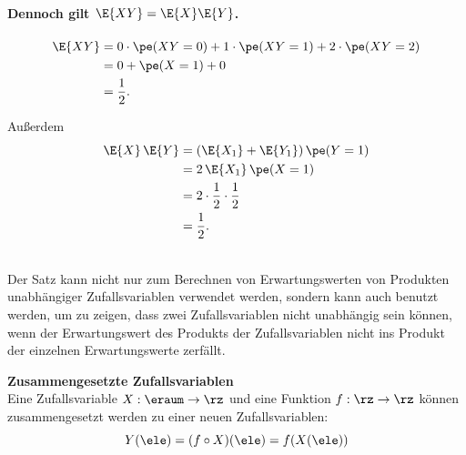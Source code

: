 \begin{bsp}
    \paragraph{Dennoch gilt \(\E{XY}=\E{X}\E{Y}\).}

    \[
        \begin{aligned}
            \E{XY}
            &=
            0\cdot \pe(XY=0)
            +
            1\cdot \pe(XY=1)
            +
            2\cdot \pe(XY=2)
            \\
            &=
            0+\pe(X=1)+0
            \\
            &=
            \frac12.
        \end{aligned}
    \]

    Außerdem
    \[
        \begin{aligned}
            \E{X}\,\E{Y}
            &=
            (\E{X_1}+\E{Y_1})\,\pe(Y=1)
            \\
            &=
            2\,\E{X_1}\,\pe(X=1)
            \\
            &=
            2\cdot\frac12\cdot\frac12
            \\
            &=
            \frac12.
        \end{aligned}
    \]
\end{bsp}

\begin{bem}  \\
Der Satz kann nicht nur zum Berechnen von Erwartungswerten von Produkten
    unabhängiger Zufallsvariablen verwendet werden, sondern kann auch benutzt
    werden, um zu zeigen, dass zwei Zufallsvariablen nicht unabhängig sein können,
    wenn der Erwartungswert des Produkts der Zufallsvariablen nicht ins Produkt der
    einzelnen Erwartungswerte zerfällt.
\end{bem}


\begin{defi}
    \textbf{Zusammengesetzte Zufallsvariablen}   \\
    Eine Zufallsvariable $X: \eraum \rightarrow \rz$ und eine  Funktion $f: \rz \rightarrow \rz$ können
    zusammengesetzt werden zu einer neuen Zufallsvariablen:
    \[
        Y(\ele) = (f \circ X)(\ele) = f(X(\ele))
    \]
\end{defi}

